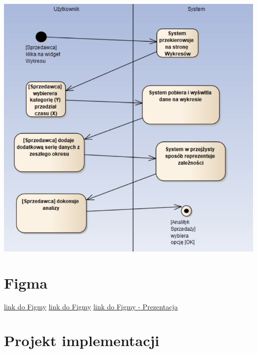 \documentclass[a4paper,11pt]{article}
\begin{document}
\includegraphics[scale=0.5]{src2/src2/c7.png}\\

\section{Figma}
\href{https://www.figma.com/file/6HQmM9ssZsjX2jbWcm6bmN/PGUI_PANEL_SPRZEDAWCY?node-id=0%3A1&t=sC3RxEjXZwQHD2Ov-0}{link do Figmy}
\href{https://www.figma.com/file/6HQmM9ssZsjX2jbWcm6bmN/PGUI_PANEL_SPRZEDAWCY?node-id=0%3A1&t=509EkGfDzHvN31J9-0}{link do Figmy}
\href{https://www.figma.com/proto/6HQmM9ssZsjX2jbWcm6bmN/PGUI_PANEL_SPRZEDAWCY?node-id=34%3A16652&scaling=contain&page-id=0%3A1&starting-point-node-id=34%3A16652}{link do Figmy - Prezentacja}
\section{Projekt implementacji}
\end{document}
